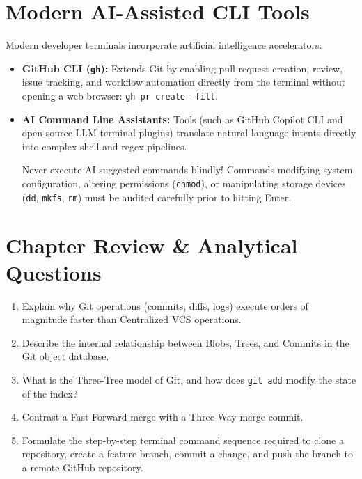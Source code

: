 \section{Modern AI-Assisted CLI Tools}
Modern developer terminals incorporate artificial intelligence accelerators:
\begin{itemize}[leftmargin=1.5em]
    \item \textbf{GitHub CLI (\texttt{gh}):} Extends Git by enabling pull request creation, review, issue tracking, and workflow automation directly from the terminal without opening a web browser: \texttt{gh pr create --fill}.
    \item \textbf{AI Command Line Assistants:} Tools (such as GitHub Copilot CLI and open-source LLM terminal plugins) translate natural language intents directly into complex shell and regex pipelines.
    \begin{warningbox}
    Never execute AI-suggested commands blindly! Commands modifying system configuration, altering permissions (\texttt{chmod}), or manipulating storage devices (\texttt{dd}, \texttt{mkfs}, \texttt{rm}) must be audited carefully prior to hitting Enter.
    \end{warningbox}
\end{itemize}

\section{Chapter Review \& Analytical Questions}
\begin{enumerate}[leftmargin=1.5em]
    \item Explain why Git operations (commits, diffs, logs) execute orders of magnitude faster than Centralized VCS operations.
    \item Describe the internal relationship between Blobs, Trees, and Commits in the Git object database.
    \item What is the Three-Tree model of Git, and how does \texttt{git add} modify the state of the index?
    \item Contrast a Fast-Forward merge with a Three-Way merge commit.
    \item Formulate the step-by-step terminal command sequence required to clone a repository, create a feature branch, commit a change, and push the branch to a remote GitHub repository.
\end{enumerate}
